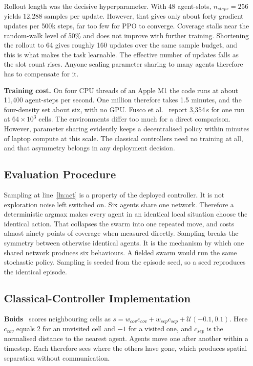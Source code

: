 \documentclass[a4paper, 10pt, conference]{ieeeconf}
\begin{document}
Rollout length was the decisive hyperparameter. With 48 agent-slots,
$n_{steps}=256$ yields 12{,}288 samples per update. However, that
gives only about forty gradient updates per 500k steps, far too few
for PPO to converge. Coverage stalls near the random-walk level of
50\% and does not improve with further training. Shortening the
rollout to 64 gives roughly 160 updates over the same sample budget,
and this is what makes the task learnable. The effective number of
updates falls as the slot count rises. Anyone scaling parameter
sharing to many agents therefore has to compensate for it.

\textbf{Training cost.} On four CPU threads of an Apple M1 the code
runs at about 11{,}400 agent-steps per second. One million therefore
takes 1.5 minutes, and the four-density set about six, with no GPU.
Fusco et al.~\cite{fusco2025} report 3{,}354\,s for one run at
$64\times10^3$ cells. The environments differ too much for a direct
comparison. However, parameter sharing evidently keeps a decentralised
policy within minutes of laptop compute at this scale. The classical
controllers need no training at all, and that asymmetry belongs in any
deployment decision.

\subsection{Evaluation Procedure}\label{sec:eval}

Sampling at line~\ref{ln:act} is a property of the deployed
controller. It is not exploration noise left switched on. Six agents
share one network. Therefore a deterministic argmax makes every agent
in an identical local situation choose the identical action. That
collapses the swarm into one repeated move, and costs almost ninety
points of coverage when measured directly. Sampling breaks the
symmetry between otherwise identical agents. It is the mechanism by
which one shared network produces six behaviours. A fielded swarm
would run the same stochastic policy. Sampling is seeded from the
episode seed, so a seed reproduces the identical episode.

\subsection{Classical-Controller Implementation}\label{sec:classical}

\textbf{Boids}~\cite{reynolds1987} scores neighbouring cells as $s =
w_{cov}c_{cov} + w_{sep}c_{sep} + \mathcal{U}(-0.1,0.1)$. Here
$c_{cov}$ equals 2 for an unvisited cell and $-1$ for a visited one,
and $c_{sep}$ is the normalised distance to the nearest agent. Agents
move one after another within a timestep. Each therefore sees where
the others have gone, which produces spatial separation without
communication.
\end{document}
